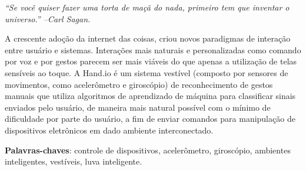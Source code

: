 \documentclass[
	12pt,				%
  oneside,
	a4paper,			%
	chapter=TITLE,		%
	english,			%
	brazil				%
	]{abntex2}
\begin{document}
\frenchspacing


\imprimircapa

\imprimirfolhaderosto

\imprimirfolhadeaprovacao
\begin{comment}
\begin{dedicatoria}
   \vspace*{\fill}
   \centering
   \noindent
   \textit{ Dedicatória }
   \vspace*{\fill}
\end{dedicatoria}

\begin{agradecimentos}[agradecimentos]

Agradeço à minha família, meus amigos e minha namorada que sempre me apoiaram, acreditaram no meus esforços e na minha capacidade de superar meus obstáculos.
\\
Agradeço 
\end{agradecimentos}
\end{comment}

\begin{epigrafe}
    \vspace*{\fill}
	\begin{flushright}
		\textit{``Se você quiser fazer uma torta de maçã do nada, primeiro tem que inventar o universo.'' --Carl Sagan.}
	\end{flushright}
\end{epigrafe}


\setlength{\absparsep}{18pt} %
\begin{resumo}[Resumo]
A crescente adoção da internet das coisas, criou novos paradigmas de interação entre usuário e sistemas. Interações mais naturais e personalizadas como comando por voz e por gestos parecem ser mais viáveis do que apenas a utilização de telas sensíveis ao toque. A Hand.io é um sistema vestível (composto por sensores de movimentos, como acelerômetro e giroscópio) de reconhecimento de gestos manuais que utiliza algoritmos de aprendizado de máquina para classificar sinais enviados pelo usuário, de maneira mais natural possível com o mínimo de dificuldade por parte do usuário, a fim de enviar comandos para manipulação de dispositivos eletrônicos em dado ambiente interconectado.

\textbf{Palavras-chaves}: controle de dispositivos, acelerômetro, giroscópio, ambientes inteligentes, vestíveis, luva inteligente.
\end{resumo}
\end{document}

